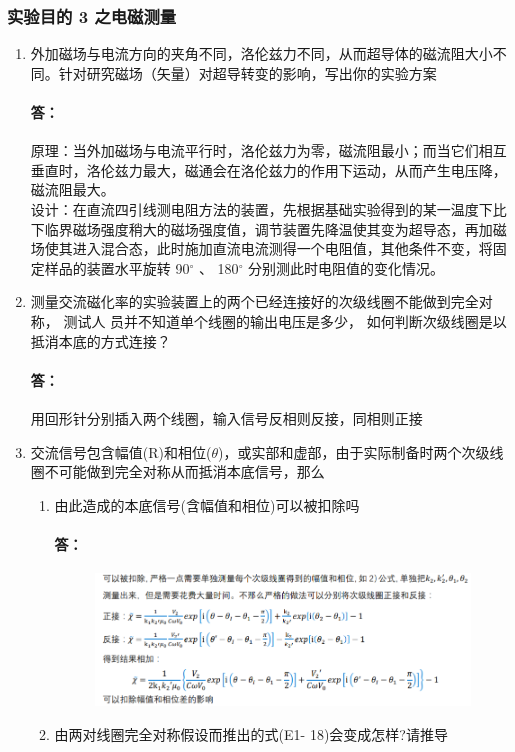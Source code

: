 \documentclass{ctexart}
\theoremstyle{ansstyle}
\begin{document}
	\subsubsection{实验目的 3 之电磁测量}
	
\begin{enumerate}	
	
	\item 外加磁场与电流方向的夹角不同，洛伦兹力不同，从而超导体的磁流阻大小不同。针对研究磁场（矢量）对超导转变的影响，写出你的实验方案
	\paragraph{答：}原理：当外加磁场与电流平行时，洛伦兹力为零，磁流阻最小；而当它们相互垂直时，洛伦兹力最大，磁通会在洛伦兹力的作用下运动，从而产生电压降，磁流阻最大。\\
	设计：在直流四引线测电阻方法的装置，先根据基础实验得到的某一温度下比下临界磁场强度稍大的磁场强度值，调节装置先降温使其变为超导态，再加磁场使其进入混合态，此时施加直流电流测得一个电阻值，其他条件不变，将固定样品的装置水平旋转 90$^\circ$ 、 180$^\circ$ 分别测此时电阻值的变化情况。
	\item 测量交流磁化率的实验装置上的两个已经连接好的次级线圈不能做到完全对称， 测试人
	员并不知道单个线圈的输出电压是多少， 如何判断次级线圈是以抵消本底的方式连接？
	\paragraph{答：}用回形针分别插入两个线圈，输入信号反相则反接，同相则正接
	\item 交流信号包含幅值(R)和相位($\theta$)，或实部和虚部，由于实际制备时两个次级线圈不可能做到完全对称从而抵消本底信号，那么
	\begin{enumerate}
		\item 由此造成的本底信号(含幅值和相位)可以被扣除吗
		\paragraph{答：}\begin{figure}[H]
			\includegraphics[width=0.8\linewidth]{./be/1}
		\end{figure}
		\item 由两对线圈完全对称假设而推出的式(E1- 18)会变成怎样?请推导

\end{enumerate}
\end{enumerate}
\end{document}
